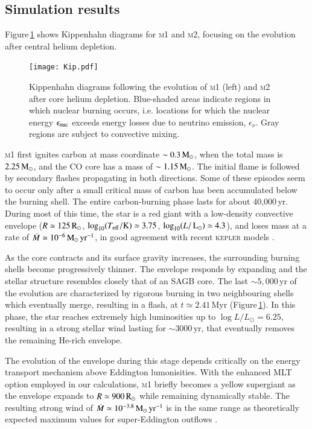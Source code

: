 \documentclass{aa}
\begin{document}
\subsection{Simulation results}
Figure\,\ref{fig:1} shows Kippenhahn diagrams for 
 \textsc{m1} and \textsc{m2}, focusing on the evolution after central helium depletion.
\begin{figure}[htb!]
  \centering 
  \texttt{[image: Kip.pdf]}
  \caption{Kippenhahn diagrams following the evolution of \textsc{m1} (left) and \textsc{m2} after core helium depletion. Blue-shaded areas indicate regions in which nuclear burning occurs, i.e. locations for which the nuclear energy $\epsilon_{\rm nuc}$ exceeds energy losses due to neutrino emission, $\epsilon_\nu$. Gray regions are subject to convective mixing.}
  \label{fig:1}
\end{figure}
\textsc{m1} first ignites carbon at mass coordinate $\sim 0.3\mathrm{\,M_\odot}$, when the total mass  is $ 2.25\mathrm{\,M_\odot}$, and the CO core has a mass of $\sim 1.15\mathrm{\,M_\odot}$.  
The initial flame is followed by secondary flashes propagating in both 
directions. Some of these episodes seem to occur only after a small critical 
mass of carbon has been accumulated below the burning shell. The entire carbon-burning phase lasts for about 
40,000\,yr. During most of this time, the star is a red giant with a low-density convective envelope  
($R\simeq 125\mathrm{\,R_\odot}$, $\log_{10} (T_{\mathrm{eff}} /\mathrm{K})\simeq 3.75$, $\log_{10} (L/\mathrm{\,L_\odot})\simeq 
4.3$), and loses mass at a rate of  
$\dot{M}\simeq10^{-6}\mathrm{\,M_{\odot}\,yr^{-1}}$, in good agreement with 
recent \textsc{kepler} models \citep{Woosley:2019sdf}. 

As the core contracts and its surface gravity increases, the surrounding burning shells become progressively thinner. The envelope responds by expanding  and the stellar structure resembles closely that of an SAGB core.
The last $\sim 5,000$\,yr of the evolution are characterized by rigorous burning in two neighbouring shells which eventually merge, resulting in a  flash, at $t\simeq 2.41$\,Myr (Figure\,\ref{fig:1}). In this phase, the star reaches extremely high luminosities up to $\log{L/L_\odot = 6.25}$, resulting in a strong stellar wind lasting for $\sim3000$\,yr, that  eventually removes the remaining He-rich envelope.

The evolution of the envelope during this stage 
depends critically on the energy transport mechanism above Eddington lumonisities. With the enhanced MLT option 
employed in our calculations,  \textsc{m1} briefly 
becomes a yellow supergiant as the envelope  expands to $R\simeq 900\mathrm{\,R_\odot}$ while remaining dynamically stable.
The resulting strong wind of $\dot{M}\simeq10^{-3.8}\mathrm{\,M_{\odot}\,yr^{-1}}$  is in the same range as theoretically expected maximum values for super-Eddington outflows \citep[][]{Owocki:2004zz,Smith2006}.
\end{document}
